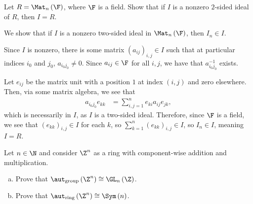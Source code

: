 \documentclass[10pt]{mypackage}
\begin{document}
\begin{problem}[Problem 7]
  Let $R = \Mat_{n}\left( \F \right)$, where $\F$ is a field. Show that if $I$ is a nonzero $2$-sided ideal of $R$, then $I = R$.
\end{problem}
\begin{solution}
  We show that if $I$ is a nonzero two-sided ideal in $\Mat_{n}\left( \F \right)$, then $I_{n}\in I$.\newline

  Since $I$ is nonzero, there is some matrix $\left( a_{ij} \right)_{i,j}\in I$ such that at particular indices $i_0$ and $j_0$, $a_{i_0j_0}\neq 0$. Since $a_{ij}\in \F$ for all $i,j$, we have that $a_{i_0j_0}^{-1}$ exists.\newline

  Let $e_{ij}$ be the matrix unit with a position $1$ at index $\left( i,j \right)$ and zero elsewhere. Then, via some matrix algebra, we see that
  \begin{align*}
    a_{i_0j_0} e_{kk} &= \sum_{i,j=1}^{n}e_{ki}a_{ij}e_{jk},
  \end{align*}
  which is necessarily in $I$, as $I$ is a two-sided ideal. Therefore, since $\F$ is a field, we see that $\left( e_{kk} \right)_{i,j}\in I$ for each $k$, so $\sum_{k=1}^{n}\left( e_{kk} \right)_{i,j}\in I$, so $I_{n}\in I$, meaning $I = R$.
\end{solution}
\begin{problem}[Problem 8]
  Let $n\in\N$ and consider $\Z^{n}$ as a ring with component-wise addition and multiplication.
  \begin{enumerate}[(a)]
    \item Prove that $\aut_{\text{group}}\left( \Z^{n} \right) \cong \GL_{n}\left( \Z \right)$.
    \item Prove that $\aut_{\text{ring}} \left( \Z^{n} \right) \cong \Sym\left( n \right)$.
  \end{enumerate}
\end{problem}
\end{document}
